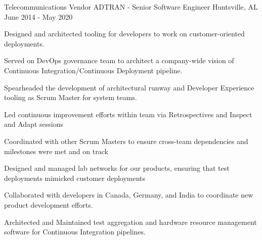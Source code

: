 
\begin{cventries}
  \cventry
    {Telecommunications Vendor} %
    {ADTRAN - Senior Software Engineer} %
    {Huntsville, AL} %
    {June 2014 - May 2020} %
    {
      \begin{cvitems} %
        \item {Designed and architected tooling for developers to work on customer-oriented deployments.}
        \item {Served on DevOps governance team to architect a company-wide vision of Continuous Integration/Continuous Deployment pipeline.}
        \item {Spearheaded the development of architectural runway and Developer Experience tooling as Scrum Master for system teams.}
        \item {Led continuous improvement efforts within team via Retrospectives and Inspect and Adapt sessions}
        \item {Coordinated with other Scrum Masters to ensure cross-team dependencies and milestones were met and on track}
        \item {Designed and managed lab networks for our products, ensuring that test deployments mimicked customer deployments}
        \item {Collaborated with developers in Canada, Germany, and India to coordinate new product development efforts.}
        \item {Architected and Maintained test aggregation and hardware resource management software for Continuous Integration pipelines.}
      \end{cvitems}
    }

\end{cventries}
